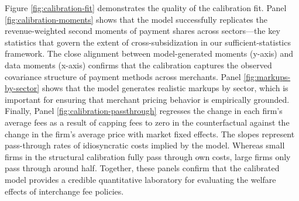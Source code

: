 \documentclass[11pt,english]{article}
\theoremstyle{remark}
\begin{document}
Figure \ref{fig:calibration-fit} demonstrates the quality of the calibration fit.
Panel \ref{fig:calibration-moments} shows that the model successfully replicates the revenue-weighted second moments of payment shares across sectors---the key statistics that govern the extent of cross-subsidization in our sufficient-statistics framework.
The close alignment between model-generated moments (y-axis) and data moments (x-axis) confirms that the calibration captures the observed covariance structure of payment methods across merchants.
Panel \ref{fig:markups-by-sector} shows that the model generates realistic markups by sector, which is important for ensuring that merchant pricing behavior is empirically grounded.
Finally, Panel \ref{fig:calibration-passthrough} regresses the change in each firm's average fees as a result of capping fees to zero in the counterfactual against the change in the firm's average price with market fixed effects. The slopes represent pass-through rates of idiosyncratic costs implied by the model. Whereas small firms in the structural calibration fully pass through own costs, large firms only pass through around half.
Together, these panels confirm that the calibrated model provides a credible quantitative laboratory for evaluating the welfare effects of interchange fee policies.
\end{document}
